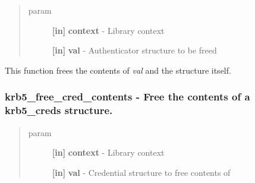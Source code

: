 \documentclass[letterpaper,10pt,english]{sphinxmanual}
\begin{document}
\begin{fulllineitems}
\label{appdev/refs/api/krb5_free_authenticator:c.krb5_free_authenticator}
\end{fulllineitems}

\begin{quote}\begin{description}
\item[{param}] \leavevmode
\textbf{{[}in{]}} \textbf{context} - Library context

\textbf{{[}in{]}} \textbf{val} - Authenticator structure to be freed

\end{description}\end{quote}

This function frees the contents of \emph{val} and the structure itself.


\subsubsection{krb5\_free\_cred\_contents -  Free the contents of a krb5\_creds structure.}
\label{appdev/refs/api/krb5_free_cred_contents::doc}\label{appdev/refs/api/krb5_free_cred_contents:krb5-free-cred-contents-free-the-contents-of-a-krb5-creds-structure}

\begin{fulllineitems}
\label{appdev/refs/api/krb5_free_cred_contents:c.krb5_free_cred_contents}
\end{fulllineitems}

\begin{quote}\begin{description}
\item[{param}] \leavevmode
\textbf{{[}in{]}} \textbf{context} - Library context

\textbf{{[}in{]}} \textbf{val} - Credential structure to free contents of

\end{description}\end{quote}
\end{document}
